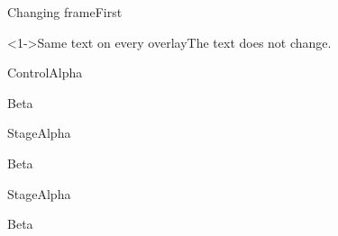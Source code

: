 \documentclass{beamer}
\begin{document}
\ocstagesetting
\ocsetting
\begin{frame}{Changing frame}First\pause\par \octext\octhird\end{frame}
\begin{frame}<1-\occount>{Same text on every overlay}The text does not change.\end{frame}
\begin{frame}{Control}Alpha\pause\par Beta\end{frame}
\begin{frame}{Stage}Alpha\pause\par Beta\end{frame}
\begin{frame}{Stage}Alpha\pause\par Beta\end{frame}
\end{document}
